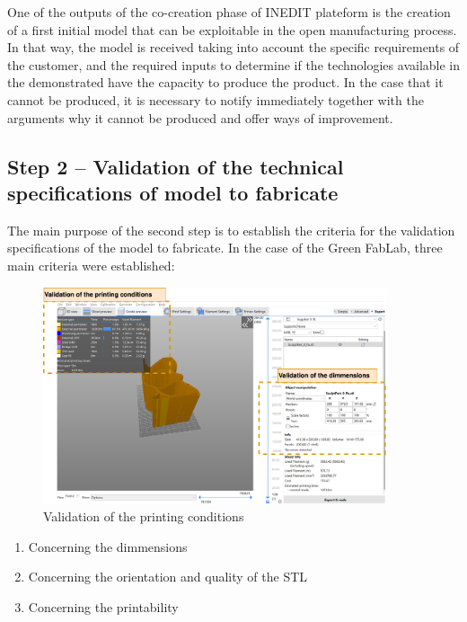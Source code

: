 \documentclass[
  11pt,
]{article}
\providecommand{\tightlist}{%
  \setlength{\itemsep}{0pt}\setlength{\parskip}{0pt}}\usepackage{longtable,booktabs,array}
\begin{document}
One of the outputs of the co-creation phase of INEDIT plateform is the
creation of a first initial model that can be exploitable in the open
manufacturing process. In that way, the model is received taking into
account the specific requirements of the customer, and the required
inputs to determine if the technologies available in the demonstrated
have the capacity to produce the product. In the case that it cannot be
produced, it is necessary to notify immediately together with the
arguments why it cannot be produced and offer ways of improvement.

\hypertarget{step-2-validation-of-the-technical-specifications-of-model-to-fabricate}{%
\subsection{Step 2 -- Validation of the technical specifications of
model to
fabricate}\label{step-2-validation-of-the-technical-specifications-of-model-to-fabricate}}

The main purpose of the second step is to establish the criteria for the
validation specifications of the model to fabricate. In the case of the
Green FabLab, three main criteria were established:

\begin{figure}[H]

{\centering \includegraphics[width=0.9\textwidth,height=\textheight]{figures/Step-2.png}

}

\caption{\label{fig-step2}Validation of the printing conditions}

\end{figure}

\begin{enumerate}
\def\labelenumi{\arabic{enumi}.}
\tightlist
\item
  Concerning the dimmensions
\item
  Concerning the orientation and quality of the STL
\item
  Concerning the printability
\end{enumerate}
\end{document}
